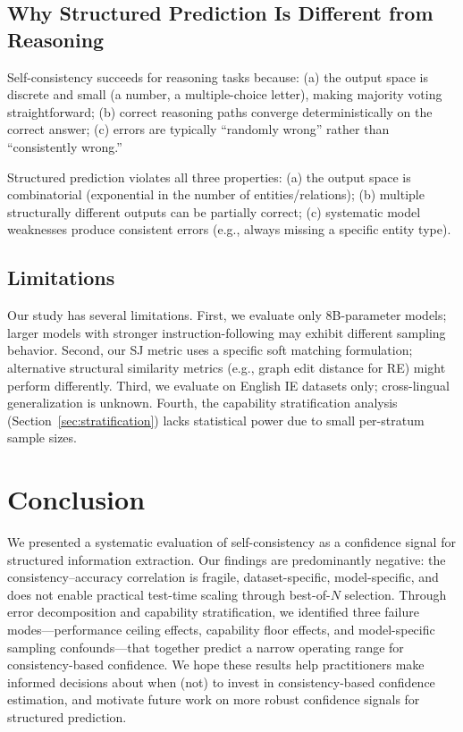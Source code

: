 \documentclass[11pt,a4paper]{article}
\begin{document}
\subsection{Why Structured Prediction Is Different from Reasoning}

Self-consistency succeeds for reasoning tasks because: (a) the output space is discrete and small (a number, a multiple-choice letter), making majority voting straightforward; (b) correct reasoning paths converge deterministically on the correct answer; (c) errors are typically ``randomly wrong'' rather than ``consistently wrong.''

Structured prediction violates all three properties: (a) the output space is combinatorial (exponential in the number of entities/relations); (b) multiple structurally different outputs can be partially correct; (c) systematic model weaknesses produce consistent errors (e.g., always missing a specific entity type).

\subsection{Limitations}

Our study has several limitations.
First, we evaluate only 8B-parameter models; larger models with stronger instruction-following may exhibit different sampling behavior.
Second, our SJ metric uses a specific soft matching formulation; alternative structural similarity metrics (e.g., graph edit distance for RE) might perform differently.
Third, we evaluate on English IE datasets only; cross-lingual generalization is unknown.
Fourth, the capability stratification analysis (Section~\ref{sec:stratification}) lacks statistical power due to small per-stratum sample sizes.

\section{Conclusion}

We presented a systematic evaluation of self-consistency as a confidence signal for structured information extraction.
Our findings are predominantly negative: the consistency--accuracy correlation is fragile, dataset-specific, model-specific, and does not enable practical test-time scaling through best-of-$N$ selection.
Through error decomposition and capability stratification, we identified three failure modes---performance ceiling effects, capability floor effects, and model-specific sampling confounds---that together predict a narrow operating range for consistency-based confidence.
We hope these results help practitioners make informed decisions about when (not) to invest in consistency-based confidence estimation, and motivate future work on more robust confidence signals for structured prediction.
\end{document}
